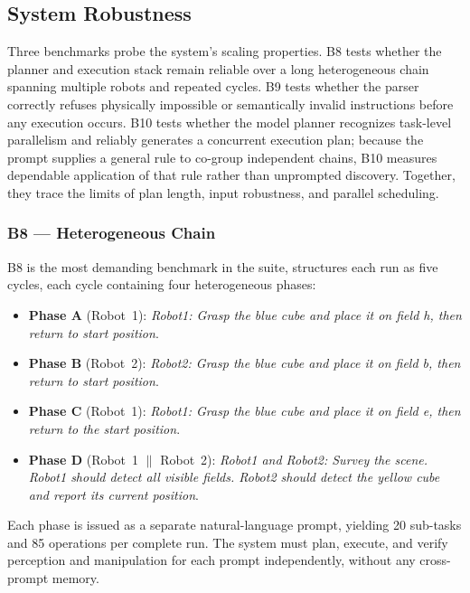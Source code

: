 \documentclass[
     12pt,
     a4paper,
     BCOR=10mm,
     DIV=14,
     listof=totoc,
     bibliography=totoc,
     parskip,
     twoside,
     headsepline
     ]{scrreprt}
\begin{document}
\subsection{System Robustness}\label{sec:results-robustness}
Three benchmarks probe the system's scaling properties. B8 tests whether the planner and execution stack remain reliable over a long heterogeneous chain spanning multiple robots and repeated cycles. B9 tests whether the parser correctly refuses physically impossible or semantically invalid instructions before any execution occurs. B10 tests whether the model planner recognizes task-level parallelism and reliably generates a concurrent execution plan; because the prompt supplies a general rule to co-group independent chains, B10 measures dependable application of that rule rather than unprompted discovery. Together, they trace the limits of plan length, input robustness, and parallel scheduling.

\subsubsection{B8 --- Heterogeneous Chain}
B8 is the most demanding benchmark in the suite, structures each run as five cycles, each cycle containing four heterogeneous phases:

\begin{itemize}
	\item \textbf{Phase A} (Robot~1): \textit{Robot1: Grasp the blue cube and place it on field h, then return to start position}.
	\item \textbf{Phase B} (Robot~2): \textit{Robot2: Grasp the blue cube and place it on field b, then return to start position}.
	\item \textbf{Phase C} (Robot~1): \textit{Robot1: Grasp the blue cube and place it on field e, then return to the start position}.
	\item \textbf{Phase D} (Robot~1 $\parallel$ Robot~2): \textit{Robot1 and Robot2: Survey the scene. Robot1 should detect all visible fields. Robot2 should detect the yellow cube and report its current position}.
\end{itemize}

Each phase is issued as a separate natural-language prompt, yielding 20 sub-tasks and 85 operations per complete run. The system must plan, execute, and verify perception and manipulation for each prompt independently, without any cross-prompt memory.
\end{document}
